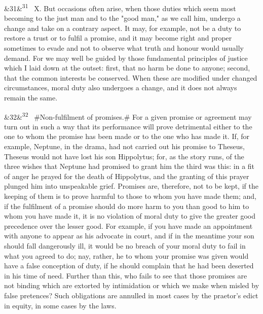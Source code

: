 \documentclass[12pt]{article}
\newcommand{\para}[1][]{\par\noindent\ifx&#1&\else\textsuperscript{\footnotesize #1}~\fi}
\begin{document}
\para[31] X. But occasions often arise, when those duties which seem most becoming to the just man and to the "good man," as we call him, undergo a change and take on a contrary aspect. It may, for example, not be a duty to restore a trust or to fulfil a promise, and it may become right and proper sometimes to evade and not to observe what truth and honour would usually demand. For we may well be guided by those fundamental principles of justice which I laid down at the outset: first, that no harm be done to anyone; second, that the common interests be conserved. When these are modified under changed circumstances, moral duty also undergoes a change, and it does not always remain the same.

\para[32] \#Non-fulfilment of promises.\# For a given promise or agreement may turn out in such a way that its performance will prove detrimental either to the one to whom the promise has been made or to the one who has made it. If, for example, Neptune, in the drama, had not carried out his promise to Theseus, Theseus would not have lost his son Hippolytus; for, as the story runs, of the three wishes that Neptune had promised to grant him the third was this: in a fit of anger he prayed for the death of Hippolytus, and the granting of this prayer plunged him into unspeakable grief. Promises are, therefore, not to be kept, if the keeping of them is to prove harmful to those to whom you have made them; and, if the fulfilment of a promise should do more harm to you than good to him to whom you have made it, it is no violation of moral duty to give the greater good precedence over the lesser good. For example, if you have made an appointment with anyone to appear as his advocate in court, and if in the meantime your son should fall dangerously ill, it would be no breach of your moral duty to fail in what you agreed to do; nay, rather, he to whom your promise was given would have a false conception of duty, if he should complain that he had been deserted in his time of need. Further than this, who fails to see that those promises are not binding which are extorted by intimidation or which we make when misled by false pretences? Such obligations are annulled in most cases by the praetor's edict in equity, in some cases by the laws.
\end{document}
